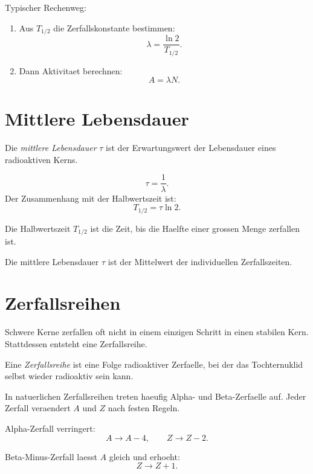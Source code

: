 \begin{examtipbox}
Typischer Rechenweg:
\begin{enumerate}
    \item Aus $T_{1/2}$ die Zerfallskonstante bestimmen:
    \[
        \lambda=\frac{\ln 2}{T_{1/2}}.
    \]
    \item Dann Aktivitaet berechnen:
    \[
        A=\lambda N.
    \]
\end{enumerate}
\end{examtipbox}

\section{Mittlere Lebensdauer}

\begin{definitionbox}
Die \emph{mittlere Lebensdauer} $\tau$ ist der Erwartungswert der Lebensdauer eines
radioaktiven Kerns.
\end{definitionbox}

\begin{formulabox}
\[
    \tau=\frac{1}{\lambda}.
\]
Der Zusammenhang mit der Halbwertszeit ist:
\[
    T_{1/2}=\tau\ln 2.
\]
\end{formulabox}

\begin{conceptbox}
Die Halbwertszeit $T_{1/2}$ ist die Zeit, bis die Haelfte einer grossen Menge
zerfallen ist.

Die mittlere Lebensdauer $\tau$ ist der Mittelwert der individuellen Zerfallszeiten.
\end{conceptbox}

\section{Zerfallsreihen}

Schwere Kerne zerfallen oft nicht in einem einzigen Schritt in einen stabilen Kern.
Stattdessen entsteht eine Zerfallsreihe.

\begin{definitionbox}
Eine \emph{Zerfallsreihe} ist eine Folge radioaktiver Zerfaelle, bei der das
Tochternuklid selbst wieder radioaktiv sein kann.
\end{definitionbox}

\begin{conceptbox}
In natuerlichen Zerfallsreihen treten haeufig Alpha- und Beta-Zerfaelle auf.
Jeder Zerfall veraendert $A$ und $Z$ nach festen Regeln.

Alpha-Zerfall verringert:
\[
    A \rightarrow A-4,
    \qquad
    Z \rightarrow Z-2.
\]

Beta-Minus-Zerfall laesst $A$ gleich und erhoeht:
\[
    Z \rightarrow Z+1.
\]
\end{conceptbox}

